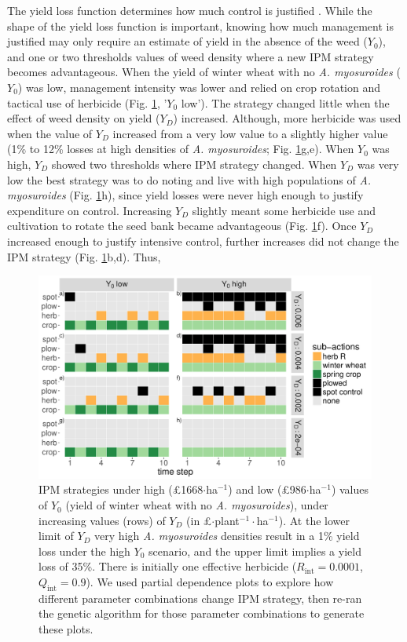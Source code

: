 \documentclass[9pt,twocolumn,twoside,lineno]{pnas-new}
\begin{document}
The yield loss function determines how much control is justified \citep{Yoko2009}. While the shape of the yield loss function is important, knowing how much management is justified may only require an estimate of yield in the absence of the weed ($Y_0$), and one or two thresholds values of weed density where a new IPM strategy becomes advantageous. When the yield of winter wheat with no \textit{A. myosuroides} ($Y_0$) was low, management intensity was lower and relied on crop rotation and tactical use of herbicide (Fig. \ref{fig:Y0_YD}, '$Y_0$ low'). The strategy changed little when the effect of weed density on yield ($Y_D$) increased. Although, more herbicide was used when the value of $Y_D$ increased from a very low value to a slightly higher value (1\% to 12\% losses at high densities of \textit{A. myosuroides}; Fig. \ref{fig:Y0_YD}g,e). When $Y_0$ was high, $Y_D$ showed two thresholds where IPM strategy changed. When $Y_D$ was very low the best strategy was to do noting and live with high populations of \textit{A. myosuroides} (Fig. \ref{fig:Y0_YD}h), since yield losses were never high enough to justify expenditure on control. Increasing $Y_D$ slightly meant some herbicide use and cultivation to rotate the seed bank became advantageous (Fig. \ref{fig:Y0_YD}f). Once $Y_D$ increased enough to justify intensive control, further increases did not change the IPM strategy (Fig. \ref{fig:Y0_YD}b,d). Thus, 
\begin{figure}
	\centering
	\includegraphics[width=1\linewidth]{MS_act_seq_YD_Y0.pdf}
	\caption{IPM strategies under high (\pounds 1668$\cdot$ha$^{-1}$) and low (\pounds 986$\cdot$ha$^{-1}$) values of $Y_0$ (yield of winter wheat with no \textit{A. myosuroides}), under increasing values (rows) of $Y_D$ (in \pounds$\cdot$plant$^{-1}\cdot$ha$^{-1}$). At the lower limit of $Y_D$ very high \textit{A. myosuroides} densities result in a 1\% yield loss under the high $Y_0$ scenario, and the upper limit implies a yield loss of 35\%. There is initially one effective herbicide ($R_\text{int} = 0.0001$, $Q_\text{int} = 0.9$). We used partial dependence plots to explore how different parameter combinations change IPM strategy, then re-ran the genetic algorithm for those parameter combinations to generate these plots.}
	\label{fig:Y0_YD} 
\end{figure}
\end{document}
